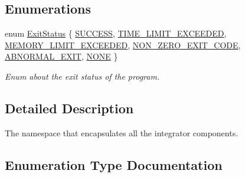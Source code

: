 \subsection*{Enumerations}
\begin{DoxyCompactItemize}
\item 
enum \mbox{\hyperlink{namespacetestcaser_1_1integrator_a68fcfdfd3f063954e9fd1a94f4b4f755}{Exit\+Status}} \{ \newline
\mbox{\hyperlink{namespacetestcaser_1_1integrator_a68fcfdfd3f063954e9fd1a94f4b4f755aabd86206819bb8e25fbb0961a8e38b20}{S\+U\+C\+C\+E\+SS}}, 
\mbox{\hyperlink{namespacetestcaser_1_1integrator_a68fcfdfd3f063954e9fd1a94f4b4f755a214e8c3d49482c1eaa0a66bab902d23f}{T\+I\+M\+E\+\_\+\+L\+I\+M\+I\+T\+\_\+\+E\+X\+C\+E\+E\+D\+ED}}, 
\mbox{\hyperlink{namespacetestcaser_1_1integrator_a68fcfdfd3f063954e9fd1a94f4b4f755a6269ea8263c3a49febe9c8a99e7b23fa}{M\+E\+M\+O\+R\+Y\+\_\+\+L\+I\+M\+I\+T\+\_\+\+E\+X\+C\+E\+E\+D\+ED}}, 
\mbox{\hyperlink{namespacetestcaser_1_1integrator_a68fcfdfd3f063954e9fd1a94f4b4f755a1d7d345211dfb2ecd7dee320e2e1ef26}{N\+O\+N\+\_\+\+Z\+E\+R\+O\+\_\+\+E\+X\+I\+T\+\_\+\+C\+O\+DE}}, 
\newline
\mbox{\hyperlink{namespacetestcaser_1_1integrator_a68fcfdfd3f063954e9fd1a94f4b4f755a2ce390b274b1bcf051de718e8fd8c9da}{A\+B\+N\+O\+R\+M\+A\+L\+\_\+\+E\+X\+IT}}, 
\mbox{\hyperlink{namespacetestcaser_1_1integrator_a68fcfdfd3f063954e9fd1a94f4b4f755a403ea6d636dc0acbe94a0cc506a0c852}{N\+O\+NE}}
 \}
\begin{DoxyCompactList}\small\item\em Enum about the exit status of the program. \end{DoxyCompactList}\end{DoxyCompactItemize}


\subsection{Detailed Description}
The namespace that encapsulates all the integrator components. 



\subsection{Enumeration Type Documentation}
\mbox{\label{namespacetestcaser_1_1integrator_a68fcfdfd3f063954e9fd1a94f4b4f755}} 
